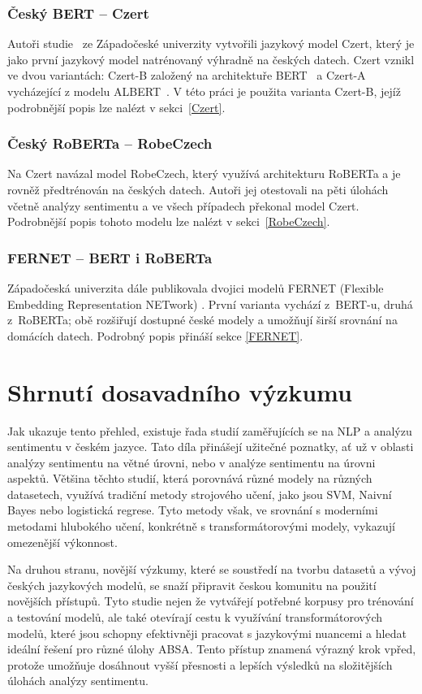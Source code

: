 \subsubsection{Český BERT -- Czert}
Autoři studie~\cite{sido2021czertczechbertlike} ze Západočeské univerzity vytvořili jazykový model Czert, který je jako první jazykový model natrénovaný výhradně na českých datech. Czert vznikl ve dvou variantách: Czert-B založený na architektuře BERT~\cite{devlin2019bert} a Czert-A vycházející z modelu ALBERT~\cite{lan2020albertlitebertselfsupervised}. V této práci je použita varianta Czert-B, jejíž podrobnější popis lze nalézt v sekci~\ref{Czert}.

\subsubsection{Český RoBERTa -- RobeCzech}
Na Czert navázal model RobeCzech, který využívá architekturu RoBERTa a je rovněž předtrénován na českých datech. Autoři jej otestovali na pěti úlohách včetně analýzy sentimentu a ve všech případech překonal model Czert.~\cite{Straka_2021} Podrobnější popis tohoto modelu lze nalézt v sekci~\ref{RobeCzech}.

\subsubsection{FERNET -- BERT i RoBERTa}
Západočeská univerzita dále publikovala dvojici modelů FERNET (Flexible Embedding Representation NETwork) \cite{Lehe_ka_2021}. První varianta vychází z~BERT-u, druhá z~RoBERTa; obě rozšiřují dostupné české modely a umožňují širší srovnání na domácích datech. Podrobný popis přináší sekce \ref{FERNET}.

\section{Shrnutí dosavadního výzkumu}
Jak ukazuje tento přehled, existuje řada studií zaměřujících se na NLP a analýzu sentimentu v českém jazyce. Tato díla přinášejí užitečné poznatky, ať už v oblasti analýzy sentimentu na větné úrovni, nebo v analýze sentimentu na úrovni aspektů. Většina těchto studií, která porovnává různé modely na různých datasetech, využívá tradiční metody strojového učení, jako jsou SVM, Naivní Bayes nebo logistická regrese. Tyto metody však, ve srovnání s moderními metodami hlubokého učení, konkrétně s transformátorovými modely, vykazují omezenější výkonnost.

Na druhou stranu, novější výzkumy, které se soustředí na tvorbu datasetů a vývoj českých jazykových modelů, se snaží připravit českou komunitu na použití novějších přístupů. Tyto studie nejen že vytvářejí potřebné korpusy pro trénování a testování modelů, ale také otevírají cestu k využívání transformátorových modelů, které jsou schopny efektivněji pracovat s jazykovými nuancemi a hledat ideální řešení pro různé úlohy ABSA. Tento přístup znamená výrazný krok vpřed, protože umožňuje dosáhnout vyšší přesnosti a lepších výsledků na složitějších úlohách analýzy sentimentu.

